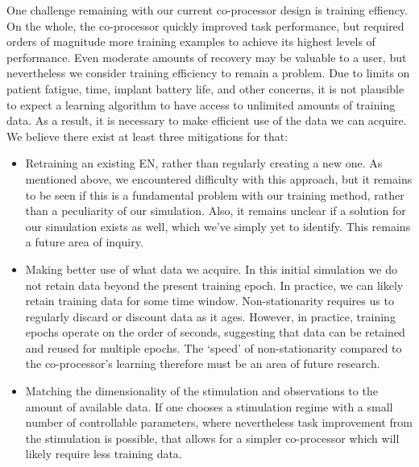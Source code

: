 \documentclass[12pt]{iopart}
\begin{document}
One challenge remaining with our current co-processor design is training effiency.
On the whole, the co-processor quickly improved task performance, but required orders of
magnitude more training examples to achieve its highest levels of performance. Even
moderate amounts of recovery may be valuable to a user, but nevertheless we consider
training efficiency to remain a problem. Due to limits on patient fatigue, time, implant
battery life, and other concerns, it is not plausible to expect a learning algorithm
to have access to unlimited amounts of training data. As a result, it is necessary to
make efficient use of the data we can acquire. We believe there exist at least three
mitigations for that:

\begin{itemize}
	\item Retraining an existing EN, rather than regularly creating a new one. As
	      mentioned above, we encountered difficulty with this approach, but it remains
	      to be seen if this is a fundamental problem with our training method, rather
	      than a peculiarity of our simulation. Also, it remains unclear if a solution
	      for our simulation exists as well, which we've simply yet to identify. This
	      remains a future area of inquiry.
	\item Making better use of what data we acquire. In this initial simulation we do
	      not retain data beyond the present training epoch. In practice, we can likely
	      retain training data for some time window. Non-stationarity requires us to
	      regularly discard or discount data as it ages. However, in practice, training
	      epochs operate on the order of seconds, suggesting that data can be retained
	      and reused for multiple epochs. The `speed' of non-stationarity compared to
	      the co-processor's learning therefore must be an area of future research.
	\item Matching the dimensionality of the stimulation and observations
	      to the amount of available data. If one chooses a stimulation regime with
	      a small number of controllable parameters, where nevertheless task improvement
	      from the stimulation is possible, that allows for a simpler co-processor which
	      will likely require less training data.
\end{itemize}
\end{document}
